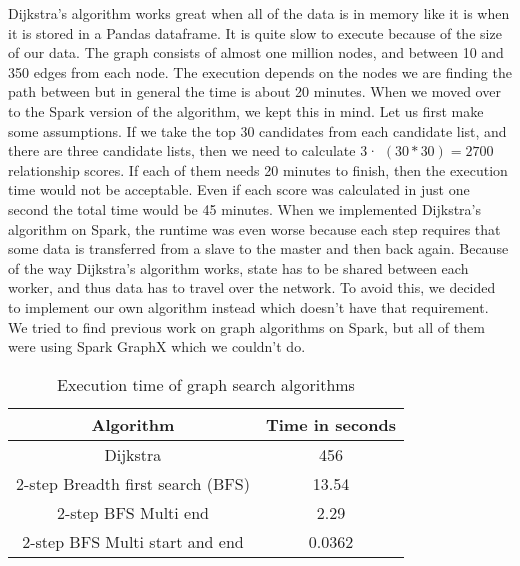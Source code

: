 Dijkstra's algorithm works great when all of the data is in memory like it is when it is stored in a Pandas dataframe. It is quite slow to execute because of the size of our data. The graph consists of almost one million nodes, and between 10 and 350 edges from each node. The execution depends on the nodes we are finding the path between but in general the time is about 20 minutes. When we moved over to the Spark version of the algorithm, we kept this in mind. Let us first make some assumptions. If we take the top 30 candidates from each candidate list, and there are three candidate lists, then we need to calculate 3· $(30*30)=2700$ relationship scores. If each of them needs 20 minutes to finish, then the execution time would not be acceptable. Even if each score was calculated in just one second the total time would be 45 minutes. When we implemented Dijkstra's algorithm on Spark, the runtime was even worse because each step requires that some data is transferred from a slave to the master and then back again. Because of the way Dijkstra's algorithm works, state has to be shared between each worker, and thus data has to travel over the network. To avoid this, we decided to implement our own algorithm instead which doesn’t have that requirement. We tried to find previous work on graph algorithms on Spark, but all of them were using Spark GraphX which we couldn’t do.

\begin{table}[h]
    \centering
        \begin{tabular}{ |c|c| } 
            \hline
            \textbf{Algorithm} & \textbf{Time in seconds} \\ 
            \hline
            Dijkstra & 456 \\ 
            2-step Breadth first search (BFS) & 13.54 \\ 
            2-step BFS Multi end & 2.29 \\ 
            2-step BFS Multi start and end & 0.0362 \\
            \hline
        \end{tabular}
        \caption{Execution time of graph search algorithms}
        \label{SearchAlgorithmTable}
\end{table}


